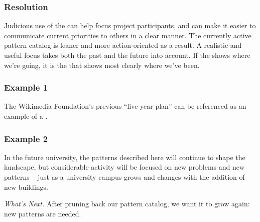 \subsubsection*{Resolution} 
Judicious use of the  can help focus project participants, and can make it easier to communicate current priorities to others in a clear manner.  The currently active pattern catalog is leaner and more action-oriented as a result.
%
A realistic and useful focus takes both the past and the future into account.  If the 
shows where we're going, it is the  that shows most clearly where we've been.

\subsubsection*{Example 1} The Wikimedia Foundation's previous ``five year plan'' can be referenced as an example of a
 \cite{wikimedia2011plan}.

\subsubsection*{Example 2} 
In the future university, the patterns described here will continue to
shape the landscape, but considerable activity will be focused on new
problems and new patterns -- just as a university campus grows and
changes with the addition of new buildings.

\begin{framed}
\noindent 
\emph{What's Next.}
After pruning back our pattern catalog, we want it to grow again: new patterns are needed.
\end{framed}


